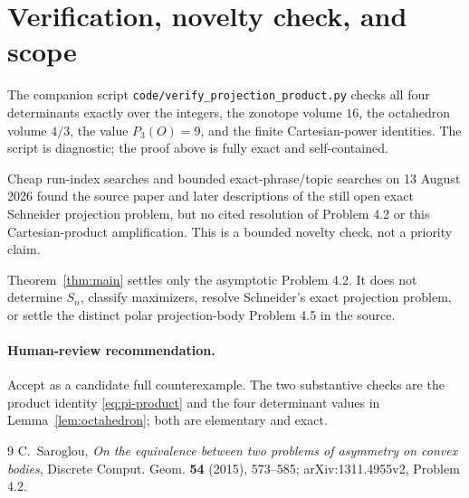 \documentclass[10pt]{article}
\begin{document}
\section{Verification, novelty check, and scope}

The companion script \texttt{code/verify\_projection\_product.py} checks
all four determinants exactly over the integers, the zonotope volume
$16$, the octahedron volume $4/3$, the value $P_3(O)=9$, and the finite
Cartesian-power identities.  The script is diagnostic; the proof above is
fully exact and self-contained.

Cheap run-index searches and bounded exact-phrase/topic searches on
13 August 2026 found the source paper and later descriptions of the still
open exact Schneider projection problem, but no cited resolution of
Problem 4.2 or this Cartesian-product amplification.  This is a bounded
novelty check, not a priority claim.

Theorem~\ref{thm:main} settles only the asymptotic Problem 4.2.  It does
not determine $S_n$, classify maximizers, resolve Schneider's exact
projection problem, or settle the distinct polar projection-body Problem
4.5 in the source.

\paragraph{Human-review recommendation.}
Accept as a candidate full counterexample.  The two substantive checks are
the product identity \eqref{eq:pi-product} and the four determinant values
in Lemma~\ref{lem:octahedron}; both are elementary and exact.

\begin{thebibliography}{9}
C.~Saroglou,
\emph{On the equivalence between two problems of asymmetry on convex bodies},
Discrete Comput. Geom. \textbf{54} (2015), 573--585;
arXiv:1311.4955v2, Problem 4.2.
\end{thebibliography}
\end{document}
